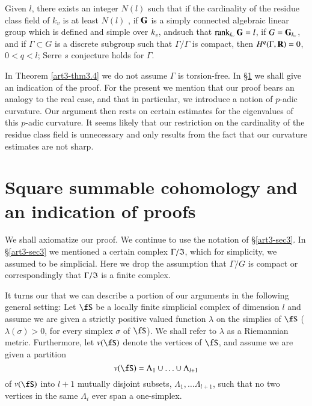 \setcounter{theorem}{3}
\begin{theorem}\label{art3-thm3.4}
Given $l$, there exists an integer $N(l)$ such that if the cardinality of the residue class field of $k_v$ is at least $N(l)$ , if $\mathbf{G}$ is a simply connected algebraic linear group which is defined and simple over $k_v$, and\pageoriginale such that $\operatorname{rank}_{k_v} \mathbf{G} = l$, if $G = \mathbf{G}_{k_v}$, and if $\Gamma \subset G$ is a discrete subgroup such that $\Gamma/ \Gamma $ is compact, then $H^q(\Gamma, \mathbf{R}) =0$, $0 < q < l$; \iec Serre $s$ conjecture holds for $\Gamma$.
\end{theorem}

\begin{remark*}
In Theorem \ref{art3-thm3.4} we do not assume $\Gamma$ is torsion-free. In \S \ref{art3-sec4} we shall give an indication of the proof. For the present we mention that our proof bears an analogy to the real case, and that in particular, we introduce a notion of $p$-adic curvature. Our argument then rests on certain estimates for the eigenvalues of this $p$-adic curvature. It seems likely that our restriction on the cardinality of the residue class field is unnecessary and only results from the fact that our curvature estimates are not sharp.
\end{remark*}

\section{Square summable cohomology and an indication of proofs}\label{art3-sec4}
We shall axiomatize our proof. We continue to use the notation of \S \ref{art3-sec3}. In \S\ref{art3-sec3} we mentioned a certain complex $\Gamma/\mathfrak{I}$, which for simplicity, we assumed to be simplicial. Here we drop the assumption that $\Gamma/G$ is compact or correspondingly that $\Gamma/\mathfrak{I}$ is a finite complex.

It turns our that we can describe a portion of our arguments in the following general setting: Let $\fS$ be a locally finite simplicial complex of dimension $l$ and assume we are given a strictly positive valued function $\lambda$ on the simplies of $\fS$ ($\lambda(\sigma) > 0$, for every simplex $\sigma$ of $\fS$). We shall refer to $\lambda$ as a Riemannian metric. Furthermore, let $v (\fS)$ denote the vertices of $\fS$, and assume we are given a partition
\setcounter{equation}{0}
\begin{equation}
v (\fS) = \Lambda_1 \cup \ldots \cup \Lambda_{l+1} \label{art3-eq4.1}
\end{equation}
of $v (\fS)$ into $l+1$ mutually disjoint subsets, $\Lambda_1, \ldots \Lambda_{l+1}$, such that no two vertices in the same $\Lambda_i$ ever span a one-simplex.

